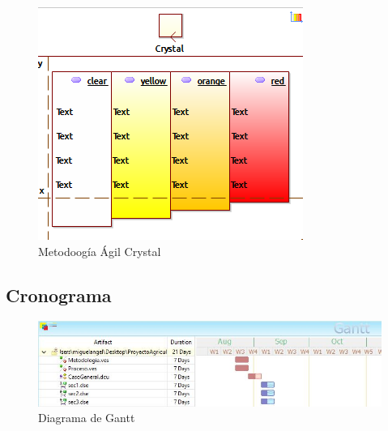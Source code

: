 \begin{figure}[h!]
	\centering
	\includegraphics[width=0.7\linewidth]{proyecto/imgs/metCrystal}
	\caption{Metodoogía Ágil Crystal}
	\label{fig:metcrystal}
\end{figure}

\newpage
\subsection{Cronograma}

\begin{figure}[h!]
	\centering
	\includegraphics[width=1.2\linewidth]{proyecto/imgs/Cronograma}
	\caption{Diagrama de Gantt}
	\label{fig:cronograma}
\end{figure}
